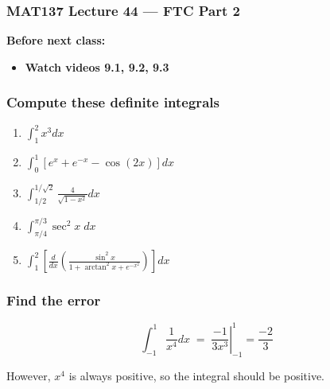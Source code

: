 \documentclass[14pt]{beamer}
\begin{document}
\begin{frame}
	\frametitle{MAT137 Lecture 44 --- FTC Part 2}

	\vfill
	{\bf Before next class:}
		\begin{itemize} \normalsize
			\item {\bf Watch videos 9.1, 9.2, 9.3}
		\end{itemize}
\end{frame}

	\begin{frame}[t]
		\frametitle{Compute these definite integrals}

		\begin{enumerate}
			\item ${\displaystyle \int_1^{2} x^3 dx}$
				\vfill

			\item ${\displaystyle \int_0^{1} \left[ e ^x + e^{-x} - \cos (2x) \right] dx}$
				\vfill

			\item ${\displaystyle \int_{1/2}^{1/\sqrt{2}} \frac{4}{\sqrt{1-x^{2}}} dx}$
				\vfill

			\item ${\displaystyle \int_{\pi/4}^{\pi/3} \sec^2 x \; dx}$
				\vfill

			\item ${\displaystyle \int_1^2 \left[ \frac{d}{dx} \left( \frac{\sin^{2} x }{1 + \arctan^{2} x + e^{-x^2}} \right) \right] dx}$
				\vfill
		\end{enumerate}
	\end{frame}
	\begin{frame}[t]
		\frametitle{Find the error}

		\[
			\int_{-1}^{1}\frac{1}{x^{4}}dx \; = \; \left. \frac{-1}{3x^{3}}\right\vert_{-1}
			^{1}= \frac{-2}{3}
		\]

		However, $x^{4}$ is always positive, so the integral should be positive.
	\end{frame}
\end{document}
